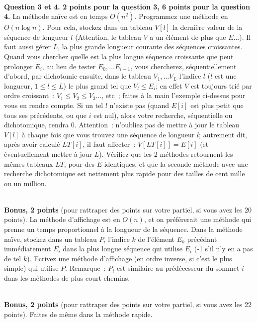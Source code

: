 \documentclass[a4paper]{article}
\begin{document}
~ \\
{\bf Question 3 et 4. 2 points pour la question 3, 6 points pour la question 4.} 
La  m\'ethode na\"ive  est en temps $O(n^2)$. Programmez une m\'ethode en $O(n\log n)$. Pour cela,  stockez dans un tableau
$V[l]$ la derni\`ere valeur de la s\'equence de longueur $l$ (Attention, le tableau $V$ a un \'el\'ement de plus que $E$...). 
Il faut aussi g\'erer $L$, la plus grande 
longueur courante des s\'equences croissantes.
Quand vous cherchez quelle est la plus longue s\'equence croissante
que peut prolonger $E_i$, au lieu de tester $E_0, \ldots E_{i-1}$, vous chercherez, s\'equentiellement d'abord,  
par dichotomie ensuite, dans le tableau $V_1, \ldots V_L$ l'indice   $l$ ($l$ est une longueur, $1 \le l \le L$) le plus grand tel que $V_l\le E_i$; 
en effet $V$ est toujours tri\'e par ordre croissant~: $V_1\le V_2\le V_3\ldots$, etc~; faites \`a la main l'exemple ci-dessus pour vous
en rendre compte. Si un tel $l$ n'existe pas (quand $E[i]$ est plus petit que tous ses pr\'ec\'edents, ou que $i$ est nul),
alors votre recherche, s\'equentielle ou dichotomique, rendra 0. 
Attention~: n'oubliez pas de mettre \`a jour le tableau $V[ l] $ \`a chaque fois que vous trouvez une s\'equence de longueur $l$; autrement dit, apr\`es avoir 
calcul\'e $LT[i]$, il faut affecter~: $V[ LT[i] ]=E[i]$ (et \'eventuellement mettre \`a jour $L$).
V\'erifiez que les 2 m\'ethodes retournent les m\^emes tableaux $LT$, pour des $E$ identiques, et que la seconde m\'ethode avec une recherche dichotomique est 
nettement plus rapide pour des tailles de cent mille ou un million.

~ \\
{\bf Bonus, 2 points } (pour rattraper des points sur votre partiel, si vous avez les 20 points). La m\'ethode d'affichage est en $O(n)$, et 
on pr\'ef\'ererait une m\'ethode qui prenne un temps proportionnel \`a la longueur de la s\'equence. 
Dans la m\'ethode na\"ive, stockez dans un tableau $P_i$ l'indice $k$ de l'\'el\'ement $E_k$ pr\'ec\'edant
imm\'ediatement $E_i$ dans la plus longue s\'equence qui utilise $E_i$ (-1 s'il n'y en a pas de tel $k$). 
Ecrivez une m\'ethode d'affichage (en ordre inverse, si c'est le plus simple) qui utilise $P$. Remarque~: $P_i$ est similaire au pr\'ed\'ecesseur 
du sommet $i$
dans les m\'ethodes de plus court chemins.

~ \\
{\bf Bonus, 2 points } (pour rattraper des points sur votre partiel, si vous avez les 22 points). Faites de m\^eme dans la m\'ethode rapide.
\end{document}
